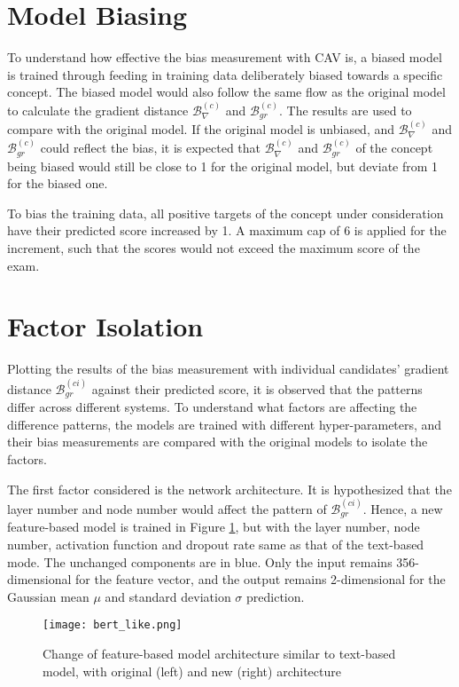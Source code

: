 \section{Model Biasing}
To understand how effective the bias measurement with CAV is, a biased model is trained through feeding in training data deliberately biased towards a specific concept. The biased model would also follow the same flow as the original model to calculate the gradient distance $\mathcal{B}^{(c)}_{\nabla}$ and $\mathcal{B}^{(c)}_{gr}$. The results are used to compare with the original model. If the original model is unbiased, and $\mathcal{B}^{(c)}_{\nabla}$ and $\mathcal{B}^{(c)}_{gr}$ could reflect the bias, it is expected that $\mathcal{B}^{(c)}_{\nabla}$ and $\mathcal{B}^{(c)}_{gr}$ of the concept being biased would still be close to 1 for the original model, but deviate from 1 for the biased one.

To bias the training data, all positive targets of the concept under consideration have their predicted score increased by 1. A maximum cap of 6 is applied for the increment, such that the scores would not exceed the maximum score of the exam.

\section{Factor Isolation}
Plotting the results of the bias measurement with individual candidates' gradient distance $\mathcal{B}^{(ci)}_{gr}$ against their predicted score, it is observed that the patterns differ across different systems. To understand what factors are affecting the difference patterns, the models are trained with different hyper-parameters, and their bias measurements are compared with the original models to isolate the factors.

The first factor considered is the network architecture. It is hypothesized that the layer number and node number would affect the pattern of $\mathcal{B}^{(ci)}_{gr}$. Hence, a new feature-based model is trained in Figure \ref{fig:bert_like}, but with the layer number, node number, activation function and dropout rate same as that of the text-based mode. The unchanged components are in blue. Only the input remains 356-dimensional for the feature vector, and the output remains 2-dimensional for the Gaussian mean $\mu$ and standard deviation $\sigma$ prediction.

\begin{figure}[H]
    \centering
    \texttt{[image: bert\_like.png]}
    \caption{Change of feature-based model architecture similar to text-based model, with original (left) and new (right) architecture}
    \label{fig:bert_like}
\end{figure}

